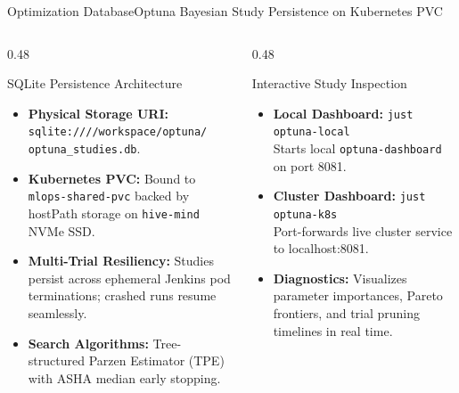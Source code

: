 \begin{frame}{Optimization Database}{Optuna Bayesian Study Persistence on Kubernetes PVC}
    \begin{columns}[T]
        \begin{column}{0.48\textwidth}
            \begin{block}{SQLite Persistence Architecture}
                \begin{itemize}\footnotesize
                    \item \textbf{Physical Storage URI:} \texttt{sqlite:////workspace/optuna/} \texttt{optuna\_studies.db}.
                    \item \textbf{Kubernetes PVC:} Bound to \texttt{mlops-shared-pvc} backed by hostPath storage on \texttt{hive-mind} NVMe SSD.
                    \item \textbf{Multi-Trial Resiliency:} Studies persist across ephemeral Jenkins pod terminations; crashed runs resume seamlessly.
                    \item \textbf{Search Algorithms:} Tree-structured Parzen Estimator (TPE) with ASHA median early stopping.
                \end{itemize}
            \end{block}
        \end{column}
        \begin{column}{0.48\textwidth}
            \begin{block}{Interactive Study Inspection}
                \begin{itemize}\footnotesize
                    \item \textbf{Local Dashboard:}
                        \texttt{just optuna-local} \\
                        \scriptsize Starts local \texttt{optuna-dashboard} on port 8081.
                    \item \textbf{Cluster Dashboard:}
                        \texttt{just optuna-k8s} \\
                        \scriptsize Port-forwards live cluster service to localhost:8081.
                    \item \textbf{Diagnostics:} Visualizes parameter importances, Pareto frontiers, and trial pruning timelines in real time.
                \end{itemize}
            \end{block}
        \end{column}
    \end{columns}

\end{frame}

